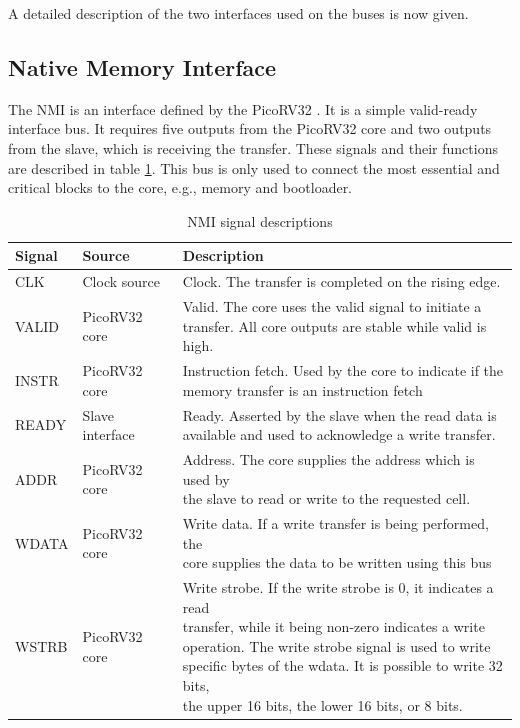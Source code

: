 A detailed description of the two interfaces used on the buses is now given.

\subsection{Native Memory Interface}
\label{nmi_if}
The NMI is an interface defined by the PicoRV32 \cite{picorv_nmi_if}. It is a simple valid-ready interface bus. It requires five outputs from the PicoRV32 core and two outputs from the slave, which is receiving the transfer. These signals and their functions are described in table \ref{tab:nmi_sig}. This bus is only used to connect the most essential and critical blocks to the core, e.g., memory and bootloader. 


\begin{table}[H]
\centering
\caption{NMI signal descriptions}
\label{tab:nmi_sig}
\begin{tabular}{lll}
\hline
\textbf{Signal} \hspace{1cm} & \textbf{Source} \hspace{1.5cm} & \textbf{Description} \\ \hline
CLK & Clock source & Clock. The transfer is completed on the rising edge. \\ \hline
VALID & PicoRV32 core & \makecell[l]{Valid. The core uses the valid signal to initiate a \\ transfer. All core outputs are stable while valid is high.} \\ \hline
INSTR & PicoRV32 core & \makecell[l]{Instruction fetch. Used by the core to indicate if the \\ memory transfer is an instruction fetch}  \\ \hline
READY & Slave interface & \makecell[l]{Ready. Asserted by the slave when the read data is \\ available and used to acknowledge a write transfer.} \\ \hline
ADDR & PicoRV32 core & \makecell[l]{Address. The core supplies the address which is used by \\ the slave to read or write to the requested cell.} \\ \hline
WDATA & PicoRV32 core & \makecell[l]{Write data. If a write transfer is being performed, the \\ core supplies the data to be written using this bus} \\ \hline
WSTRB & PicoRV32 core & \makecell[l]{Write strobe. If the write strobe is 0, it indicates a read \\ transfer, while it being non-zero indicates a write \\ operation. The write strobe signal is used to write \\ specific bytes of the wdata. It is possible to write 32 bits, \\ the upper 16 bits, the lower 16 bits, or 8 bits.}  \\ \hline

\end{tabular}
\end{table}
